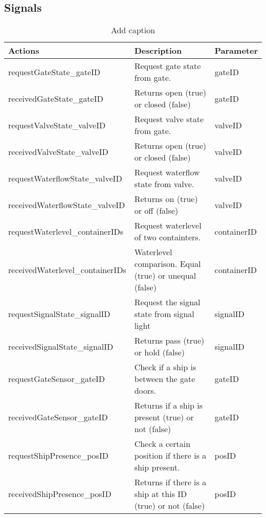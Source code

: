 \documentclass[11pt,a4paper]{article}
\begin{document}
\subsection{Signals}
\begin{table}[htbp]
	\centering
	\caption{Add caption}
	\begin{tabular}{lll}
		\toprule
		Actions & \textbf{Description} & \textbf{Parameter} \\
		\midrule
		requestGateState\_gateID & Request gate state from gate.  & gateID \\
		receivedGateState\_gateID & Returns open (true) or closed (false) & gateID \\
		requestValveState\_valveID & Request valve state from gate. & valveID \\
		receivedValveState\_valveID & Returns open (true) or closed (false) & valveID \\
		requestWaterflowState\_valveID & Request waterflow state from valve. & valveID \\
		receivedWaterflowState\_valveID & Returns on (true) or off (false) & valveID \\
		requestWaterlevel\_containerIDs & Request waterlevel of two containters. & containerID \\
		receivedWaterlevel\_containerIDs & Waterlevel comparison. Equal (true) or unequal (false) & containerID \\
		requestSignalState\_signalID & Request the signal state from signal light & signalID \\
		receivedSignalState\_signalID & Returns pass (true) or hold (false) & signalID \\
		requestGateSensor\_gateID & Check if a ship is between the gate doors. & gateID \\
		receivedGateSensor\_gateID & Returns if a ship is present (true) or not (false) & gateID \\
		requestShipPresence\_posID & Check a certain position if there is a ship present. & posID \\
		receivedShipPresence\_posID  & Returns if there is a ship at this ID (true) or not (false) & posID \\
		\bottomrule
	\end{tabular}%
	\label{tab:addlabel}%
\end{table}%
\end{document}
